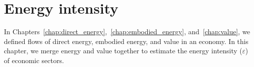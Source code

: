 %
%
%

\chapter{Energy intensity}
\label{chap:intensity} 





In Chapters~\ref{chap:direct_energy},~\ref{chap:embodied_energy}, and~\ref{chap:value}, 
we defined flows of direct energy, embodied energy, and value in an economy.
In this chapter, we merge energy and value together to estimate
the energy intensity ($\varepsilon$) of economic sectors.


